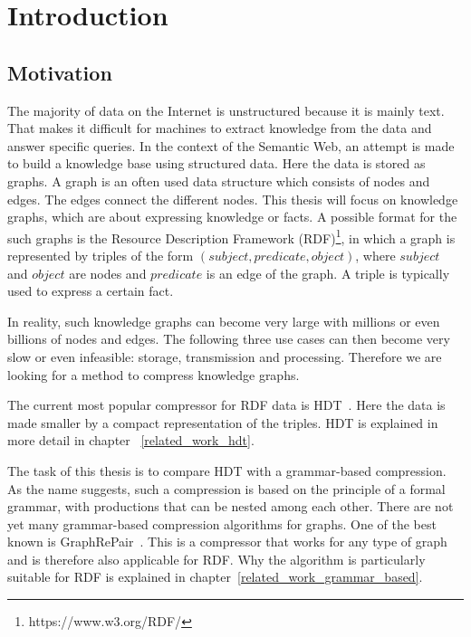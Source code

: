 \chapter{Introduction}\label{ch:introduction}

\section{Motivation}
The majority of data on the Internet is unstructured because it is mainly text. That makes it difficult for machines to extract knowledge from the data and answer specific queries. In the context of the Semantic Web, an attempt is made to build a knowledge base using structured data. Here the data is stored as graphs. A graph is an often used data structure which consists of nodes and edges. The edges connect the different nodes. This thesis will focus on knowledge graphs, which are about expressing knowledge or facts. A possible format for the such graphs is the Resource Description Framework (RDF)\footnote{\label{foot:2}https://www.w3.org/RDF/}, in which a graph is represented by triples of the form $ (subject, predicate, object) $, where $ subject $ and $object$ are nodes and $predicate$ is an edge of the graph. A triple is typically used to express a certain fact. 

In reality, such knowledge graphs can become very large with millions or even billions of nodes and edges.  The following three use cases can then become very slow or even infeasible: storage, transmission and processing. Therefore we are looking for a method to compress knowledge graphs. 

The current most popular compressor for RDF data is HDT~\cite{hdt}. Here the data is made smaller by a compact representation of the triples. HDT is explained in more detail in chapter ~\ref{related_work_hdt}.

The task of this thesis is to compare HDT with a grammar-based compression. As the name suggests, such a compression is based on the principle of a formal grammar, with productions that can be nested among each other. There are not yet many grammar-based compression algorithms for graphs. One of the best known is GraphRePair~\cite{maneth}. This is a compressor that works for any type of graph and is therefore also applicable for RDF. Why the algorithm is particularly suitable for RDF is explained in chapter~\ref{related_work_grammar_based}.

